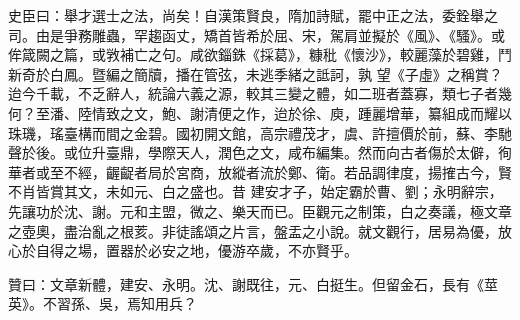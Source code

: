 \begin{pinyinscope}
 史臣曰：舉才選士之法，尚矣！自漢策賢良，隋加詩賦，罷中正之法，委銓舉之司。由是爭務雕蟲，罕趨函丈，矯首皆希於屈、宋，駕肩並擬於《風》、《騷》。或侔箴闕之篇，或敩補亡之句。咸欲錙銖《採葛》，糠秕《懷沙》，較麗藻於碧雞，鬥新奇於白鳳。暨編之簡牘，播在管弦，未逃季緒之詆訶，孰
 望《子虛》之稱賞？迨今千載，不乏辭人，統論六義之源，較其三變之體，如二班者蓋寡，類七子者幾何？至潘、陸情致之文，鮑、謝清便之作，迨於徐、庾，踵麗增華，纂組成而耀以珠璣，瑤臺構而間之金碧。國初開文館，高宗禮茂才，虞、許擅價於前，蘇、李馳聲於後。或位升臺鼎，學際天人，潤色之文，咸布編集。然而向古者傷於太僻，徇華者或至不經，齷齪者局於宮商，放縱者流於鄭、衛。若品調律度，揚搉古今，賢不肖皆賞其文，未如元、白之盛也。昔
 建安才子，始定霸於曹、劉；永明辭宗，先讓功於沈、謝。元和主盟，微之、樂天而已。臣觀元之制策，白之奏議，極文章之壺奧，盡治亂之根荄。非徒謠頌之片言，盤盂之小說。就文觀行，居易為優，放心於自得之場，置器於必安之地，優游卒歲，不亦賢乎。



 贊曰：文章新體，建安、永明。沈、謝既往，元、白挺生。但留金石，長有《莖英》。不習孫、吳，焉知用兵？



\end{pinyinscope}